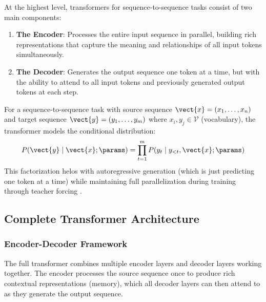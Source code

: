 At the highest level, transformers for sequence-to-sequence tasks consist of two main components:

\begin{enumerate}
  \item \textbf{The Encoder}: Processes the entire input sequence in parallel, building rich representations that capture the meaning and relationships of all input tokens simultaneously.
  \item \textbf{The Decoder}: Generates the output sequence one token at a time, but with the ability to attend to all input tokens and previously generated output tokens at each step.
\end{enumerate}

For a sequence-to-sequence task with source sequence $\vect{x} = (x_1, \ldots, x_n)$ and target sequence $\vect{y} = (y_1, \ldots, y_m)$ where $x_i, y_j \in \mathcal{V}$ (vocabulary), the transformer models the conditional distribution:
\begin{equation}
  P(\vect{y} \mid \vect{x}; \params) = \prod_{t=1}^m P(y_t \mid y_{<t}, \vect{x}; \params)
\end{equation}
This factorization helos with autoregressive generation (which is just predicting one token at a time) while maintaining full parallelization during training through teacher forcing \cite{Graves2013}.

\subsection{Complete Transformer Architecture}

\subsubsection{Encoder-Decoder Framework}

The full transformer combines multiple encoder layers and decoder layers working together. The encoder processes the source sequence once to produce rich contextual representations (memory), which all decoder layers can then attend to as they generate the output sequence.

